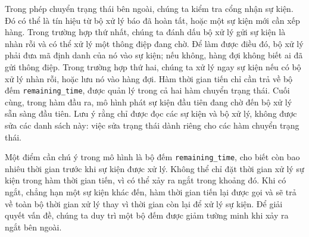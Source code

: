 Trong phép chuyển trạng thái bên ngoài, chúng ta kiểm tra cổng nhận sự kiện. Đó có thể là tín hiệu từ bộ xử lý báo đã hoàn tất, hoặc một sự kiện mới cần xếp hàng. Trong trường hợp thứ nhất, chúng ta đánh dấu bộ xử lý gửi sự kiện là nhàn rỗi và có thể xử lý một thông điệp đang chờ. Để làm được điều đó, bộ xử lý phải đưa mã định danh của nó vào sự kiện; nếu không, hàng đợi không biết ai đã gửi thông điệp. Trong trường hợp thứ hai, chúng ta xử lý ngay sự kiện nếu có bộ xử lý nhàn rỗi, hoặc lưu nó vào hàng đợi. Hàm thời gian tiến chỉ cần trả về bộ đếm \texttt{remaining\_time}, được quản lý trong cả hai hàm chuyển trạng thái. Cuối cùng, trong hàm đầu ra, mô hình phát sự kiện đầu tiên đang chờ đến bộ xử lý sẵn sàng đầu tiên. Lưu ý rằng chỉ được đọc các sự kiện và bộ xử lý, không được sửa các danh sách này: việc sửa trạng thái dành riêng cho các hàm chuyển trạng thái.

Một điểm cần chú ý trong mô hình là bộ đếm \texttt{remaining\_time}, cho biết còn bao nhiêu thời gian trước khi sự kiện được xử lý. Không thể chỉ đặt thời gian xử lý sự kiện trong hàm thời gian tiến, vì có thể xảy ra ngắt trong khoảng đó. Khi có ngắt, chẳng hạn một sự kiện khác đến, hàm thời gian tiến lại được gọi và sẽ trả về toàn bộ thời gian xử lý thay vì thời gian còn lại để xử lý sự kiện. Để giải quyết vấn đề, chúng ta duy trì một bộ đếm được giảm tường minh khi xảy ra ngắt bên ngoài.


